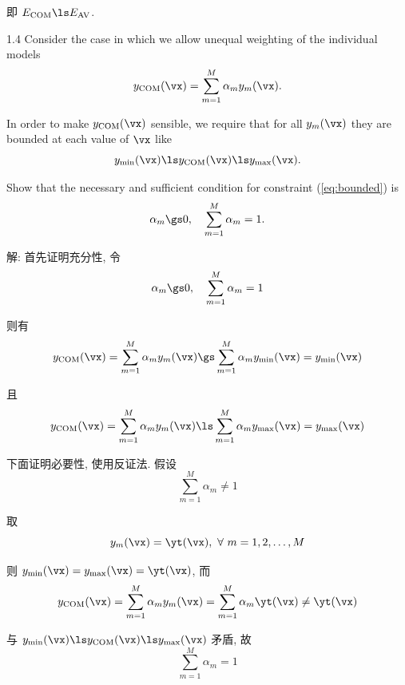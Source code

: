 \documentclass[openany]{ctexbook}
\theoremstyle{kaiti}
\theoremstyle{normal}
\begin{document}
即 $E_{\text{COM}}\ls E_{\text{AV}}$.

1.4 Consider the case in which we allow unequal weighting of the individual models
\begin{equation}
  y_{\text{COM}}(\vx)=\sum_{m=1}^{M}\alpha_{m}y_{m}(\vx).
\end{equation}

In order to make $y_{\text{COM}}(\vx)$ sensible, we require that for all $y_{m}(\vx)$ they are bounded at each value of $\vx$ like
\begin{equation}
  y_{\min}(\vx)\ls y_{\text{COM}}(\vx)\ls y_{\max}(\vx).
  \label{eq:bounded}
\end{equation}

Show that the necessary and sufficient condition for constraint (\ref{eq:bounded}) is
\begin{equation}
  \alpha_{m}\gs 0,\quad\sum_{m=1}^{M}\alpha_{m}=1.
\end{equation}

解: 首先证明充分性, 令
\begin{equation}
  \alpha_{m}\gs 0,\quad\sum_{m=1}^{M}\alpha_{m}=1
\end{equation}

则有
\begin{equation}
  y_{\text{COM}}(\vx)
  =\sum_{m=1}^{M}\alpha_{m}y_{m}(\vx)
  \gs\sum_{m=1}^{M}\alpha_{m}y_{\min}(\vx)
  =y_{\min}(\vx)
\end{equation}

且
\begin{equation}
  y_{\text{COM}}(\vx)
  =\sum_{m=1}^{M}\alpha_{m}y_{m}(\vx)
  \ls\sum_{m=1}^{M}\alpha_{m}y_{\max}(\vx)
  =y_{\max}(\vx)
\end{equation}

下面证明必要性, 使用反证法. 假设
\begin{equation}
  \sum_{m=1}^{M}\alpha_{m}\neq1
\end{equation}

取
\begin{equation}
  y_m(\vx)=\yt(\vx),~\forall~m=1,2,\dots,M
\end{equation}

则 $y_{\min}(\vx)=y_{\max}(\vx)=\yt(\vx)$, 而
\begin{equation}
  y_{\text{COM}}(\vx)
  =\sum_{m=1}^{M}\alpha_{m}y_{m}(\vx)
  =\sum_{m=1}^{M}\alpha_{m}\yt(\vx)
  \neq\yt(\vx)
\end{equation}

与 $y_{\min}(\vx)\ls y_{\text{COM}}(\vx)\ls y_{\max}(\vx)$ 矛盾, 故
\begin{equation}
  \sum_{m=1}^{M}\alpha_{m}=1
\end{equation}
\end{document}
